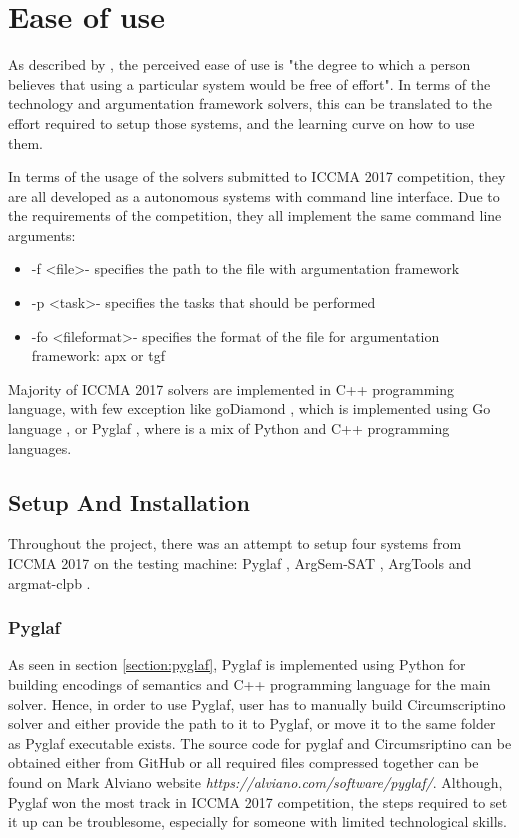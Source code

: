 
\section{Ease of use}
As described by \citet{easeOfUse}, the perceived ease of use is "the degree to which a person believes that using a particular system would be free of effort". In terms of the technology and argumentation framework solvers, this can be translated to the effort required to setup those systems, and the learning curve on how to use them. 

In terms of the usage of the solvers submitted to ICCMA 2017 competition, they are all developed as a autonomous systems with command line interface. Due to the requirements of the competition, they all implement the same command line arguments:

\begin{itemize}
	\item -f \textless file\textgreater - specifies the path to the file with argumentation framework
	\item -p \textless task\textgreater - specifies the tasks that should be performed
	\item -fo \textless fileformat\textgreater - specifies the format of the file for argumentation framework: apx or tgf
\end{itemize}

Majority of ICCMA 2017 solvers are implemented in C++ programming language, with few exception like goDiamond \citep{goDiamond}, which is implemented using Go language \citep{GoLang}, or Pyglaf \citep{pyglaf}, where is a mix of Python and C++ programming languages. 



\subsection{Setup And Installation}
Throughout the project, there was an attempt to setup four systems from ICCMA 2017 on the testing machine: Pyglaf \citep{pyglaf}, ArgSem-SAT \citep{argsemsat}, ArgTools \citep{argtools} and argmat-clpb \citep{argmat-clpb}. 

\subsubsection{Pyglaf}
As seen in section \ref{section:pyglaf}, Pyglaf is implemented using Python for building encodings of semantics and C++ programming language for the main solver. Hence, in order to use Pyglaf, user has to manually build Circumscriptino \citep{circumscriptino} solver and either provide the path to it to Pyglaf, or move it to the same folder as Pyglaf executable exists. The source code for pyglaf and Circumsriptino can be obtained either from GitHub or all required files compressed together can be found on Mark Alviano website \textit{https://alviano.com/software/pyglaf/}. Although, Pyglaf won the most track in ICCMA 2017 competition, the steps required to set it up can be troublesome, especially for someone with limited technological skills. 

